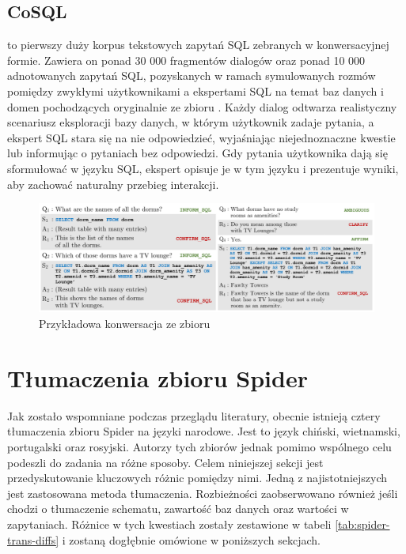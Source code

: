\subsection{CoSQL}
 to pierwszy duży korpus tekstowych zapytań SQL zebranych w konwersacyjnej formie. Zawiera on ponad 30 000 fragmentów dialogów oraz ponad 10 000 adnotowanych zapytań SQL, pozyskanych w ramach symulowanych rozmów pomiędzy zwykłymi użytkownikami a ekspertami SQL na temat baz danych i domen pochodzących oryginalnie ze zbioru . Każdy dialog odtwarza realistyczny scenariusz eksploracji bazy danych, w którym użytkownik zadaje pytania, a ekspert SQL stara się na nie odpowiedzieć, wyjaśniając niejednoznaczne kwestie lub informując o pytaniach bez odpowiedzi. Gdy pytania użytkownika dają się sformułować w języku SQL, ekspert opisuje je w tym języku i prezentuje wyniki, aby zachować naturalny przebieg interakcji.

\begin{figure}[ht!]
  \centering
  \includegraphics[width=1.0\linewidth]{images/cosql_example.png}
  \caption{Przykładowa konwersacja ze zbioru }
  \label{fig:cosql-example}
\end{figure}

\section{Tłumaczenia zbioru Spider}
Jak zostało wspomniane podczas przeglądu literatury, obecnie istnieją cztery tłumaczenia zbioru Spider na języki narodowe. Jest to język chiński, wietnamski, portugalski oraz rosyjski. Autorzy tych zbiorów jednak pomimo wspólnego celu podeszli do zadania na różne sposoby. Celem niniejszej sekcji jest przedyskutowanie kluczowych różnic pomiędzy nimi. Jedną z najistotniejszych jest zastosowana metoda tłumaczenia. Rozbieżności zaobserwowano również jeśli chodzi o tłumaczenie schematu, zawartość baz danych oraz wartości w zapytaniach. Różnice w tych kwestiach zostały zestawione w tabeli \ref{tab:spider-trans-diffs} i zostaną dogłębnie omówione w poniższych sekcjach.


